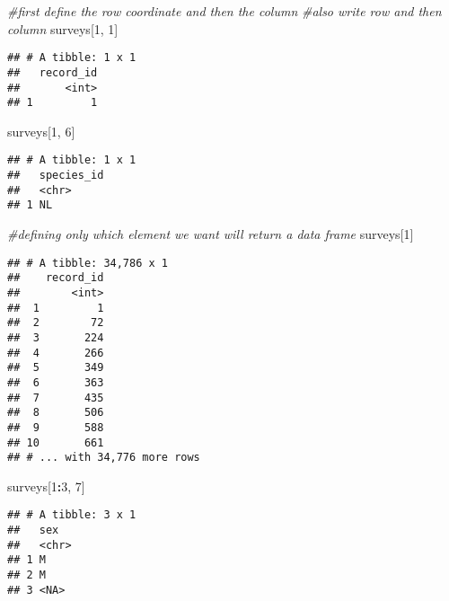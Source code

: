 \documentclass[]{article}
\newenvironment{Shaded}{\begin{snugshade}}{\end{snugshade}}
\newcommand{\DecValTok}[1]{\textcolor[rgb]{0.00,0.00,0.81}{#1}}
\newcommand{\CommentTok}[1]{\textcolor[rgb]{0.56,0.35,0.01}{\textit{#1}}}
\newcommand{\OperatorTok}[1]{\textcolor[rgb]{0.81,0.36,0.00}{\textbf{#1}}}
\newcommand{\NormalTok}[1]{#1}
\begin{document}
\begin{Shaded}
\begin{Highlighting}[]
\CommentTok{#first define the row coordinate and then the column}
\CommentTok{#also write row and then column}
\NormalTok{surveys[}\DecValTok{1}\NormalTok{, }\DecValTok{1}\NormalTok{]}
\end{Highlighting}
\end{Shaded}

\begin{verbatim}
## # A tibble: 1 x 1
##   record_id
##       <int>
## 1         1
\end{verbatim}

\begin{Shaded}
\begin{Highlighting}[]
\NormalTok{surveys[}\DecValTok{1}\NormalTok{, }\DecValTok{6}\NormalTok{]}
\end{Highlighting}
\end{Shaded}

\begin{verbatim}
## # A tibble: 1 x 1
##   species_id
##   <chr>     
## 1 NL
\end{verbatim}

\begin{Shaded}
\begin{Highlighting}[]
\CommentTok{#defining only which element we want will return a data frame}
\NormalTok{surveys[}\DecValTok{1}\NormalTok{]}
\end{Highlighting}
\end{Shaded}

\begin{verbatim}
## # A tibble: 34,786 x 1
##    record_id
##        <int>
##  1         1
##  2        72
##  3       224
##  4       266
##  5       349
##  6       363
##  7       435
##  8       506
##  9       588
## 10       661
## # ... with 34,776 more rows
\end{verbatim}

\begin{Shaded}
\begin{Highlighting}[]
\NormalTok{surveys[}\DecValTok{1}\OperatorTok{:}\DecValTok{3}\NormalTok{, }\DecValTok{7}\NormalTok{]}
\end{Highlighting}
\end{Shaded}

\begin{verbatim}
## # A tibble: 3 x 1
##   sex  
##   <chr>
## 1 M    
## 2 M    
## 3 <NA>
\end{verbatim}
\end{document}
